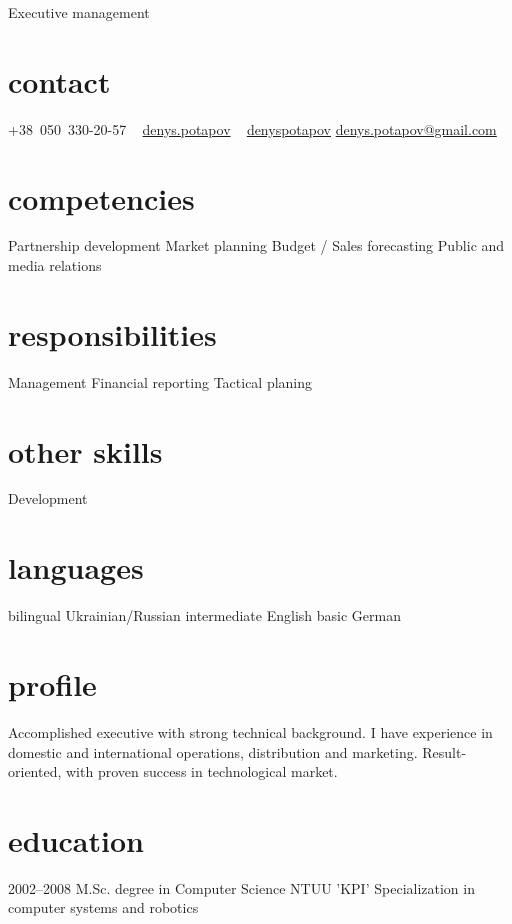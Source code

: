 \documentclass[hidelinks,a4paper]{cv}
\begin{document}
       {Executive management}

\begin{aside}
  \section{contact}
     +38~050~330-20-57
     \faFacebookOfficial~ \href{https://www.facebook.com/denys.potapov}{denys.potapov}
     \faLinkedin~ \href{https://www.linkedin.com/in/
     denyspotapov}{denyspotapov}
     \href{mailto:denys.potapov@gmail.com}{denys.potapov@gmail.com}
  \section{competencies}
    Partnership development
    Market planning
    Budget / Sales forecasting
    Public and media relations
  \section{responsibilities}
    Management
    Financial reporting
    Tactical planing
  \section{other skills}
    Development
  \section{languages}
    bilingual Ukrainian/Russian
    intermediate English
    basic German
\end{aside}

\section{profile}
Accomplished executive with strong technical background. I have experience in domestic and international operations, distribution and marketing. Result-oriented, with proven success in technological market.
\section{education}

\begin{entrylist}
  \entry
    {2002–2008}
    {M.Sc. degree in Computer Science}
    {NTUU 'KPI'}
    {Specialization in computer systems and robotics}
\end{entrylist}
\end{document}
